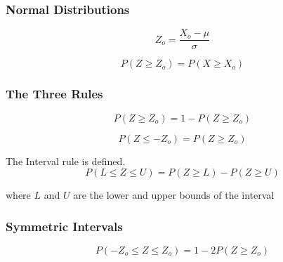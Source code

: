 \documentclass{beamer}
\begin{document}
\begin{frame}
\frametitle{Normal Distributions}
\begin{equation}
Z_{o}= \frac{ X_{o}-\mu }{\sigma}
\end{equation}

\begin{equation}
P(Z \geq Z_{o}) = P(X \geq X_{o})
\end{equation}
\end{frame}


\begin{frame}
\frametitle{The Three Rules}

\begin{equation*}\tag {1.5a}
P(Z \geq Z_{o}) = 1 - P(Z \geq Z_{o})
\end{equation*}

\begin{equation*}\tag {1.5b}
P(Z \leq - Z_{o}) = P(Z \geq Z_{o})
\end{equation*}

The Interval rule is defined.
\begin{equation*}\tag {1.5c}
P(L \leq Z \leq U) = P(Z \geq L) - P(Z \geq U)
\end{equation*}

\indent where $L$ and $U$  are the lower and upper bounds of the
interval
\end{frame}
\begin{frame}
\frametitle{Symmetric Intervals}

\begin{equation*}\tag {1.6}
P(- Z_{o} \leq Z \leq  Z_{o}) = 1 - 2P(Z \geq Z_{o})
\end{equation*}

\end{frame}
\end{document}
